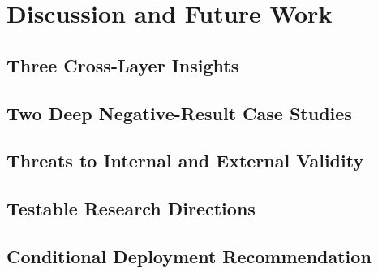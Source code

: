 \chapter{Discussion and Future Work}
\label{ch:discussion}

\section{Three Cross-Layer Insights}
\label{sec:8-1}


\section{Two Deep Negative-Result Case Studies}
\label{sec:8-2}


\section{Threats to Internal and External Validity}
\label{sec:8-3}


\section{Testable Research Directions}
\label{sec:8-4}


\section{Conditional Deployment Recommendation}
\label{sec:8-5}

